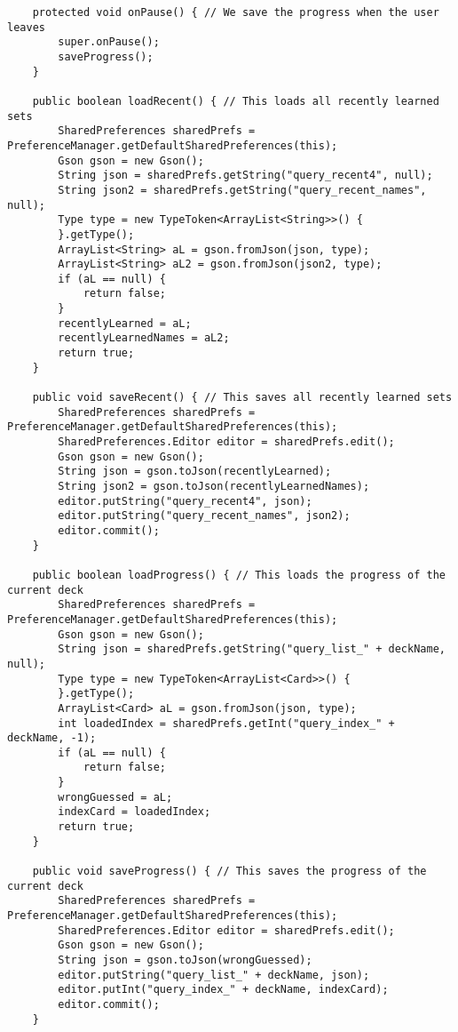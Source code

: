 \begin{lstlisting}
    protected void onPause() { // We save the progress when the user leaves
        super.onPause();
        saveProgress();
    }

    public boolean loadRecent() { // This loads all recently learned sets
        SharedPreferences sharedPrefs = PreferenceManager.getDefaultSharedPreferences(this);
        Gson gson = new Gson();
        String json = sharedPrefs.getString("query_recent4", null);
        String json2 = sharedPrefs.getString("query_recent_names", null);
        Type type = new TypeToken<ArrayList<String>>() {
        }.getType();
        ArrayList<String> aL = gson.fromJson(json, type);
        ArrayList<String> aL2 = gson.fromJson(json2, type);
        if (aL == null) {
            return false;
        }
        recentlyLearned = aL;
        recentlyLearnedNames = aL2;
        return true;
    }

    public void saveRecent() { // This saves all recently learned sets
        SharedPreferences sharedPrefs = PreferenceManager.getDefaultSharedPreferences(this);
        SharedPreferences.Editor editor = sharedPrefs.edit();
        Gson gson = new Gson();
        String json = gson.toJson(recentlyLearned);
        String json2 = gson.toJson(recentlyLearnedNames);
        editor.putString("query_recent4", json);
        editor.putString("query_recent_names", json2);
        editor.commit();
    }

    public boolean loadProgress() { // This loads the progress of the current deck
        SharedPreferences sharedPrefs = PreferenceManager.getDefaultSharedPreferences(this);
        Gson gson = new Gson();
        String json = sharedPrefs.getString("query_list_" + deckName, null);
        Type type = new TypeToken<ArrayList<Card>>() {
        }.getType();
        ArrayList<Card> aL = gson.fromJson(json, type);
        int loadedIndex = sharedPrefs.getInt("query_index_" + deckName, -1);
        if (aL == null) {
            return false;
        }
        wrongGuessed = aL;
        indexCard = loadedIndex;
        return true;
    }

    public void saveProgress() { // This saves the progress of the current deck
        SharedPreferences sharedPrefs = PreferenceManager.getDefaultSharedPreferences(this);
        SharedPreferences.Editor editor = sharedPrefs.edit();
        Gson gson = new Gson();
        String json = gson.toJson(wrongGuessed);
        editor.putString("query_list_" + deckName, json);
        editor.putInt("query_index_" + deckName, indexCard);
        editor.commit();
    }


\end{lstlisting}
